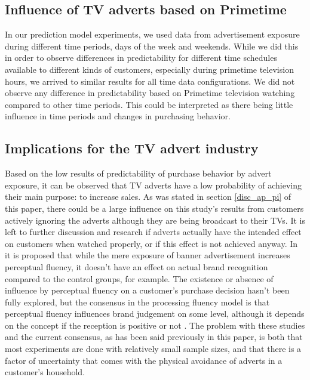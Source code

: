 \documentclass[review]{elsarticle}
\begin{document}
\subsection{Influence of TV adverts based on Primetime}
\label{disc_prime}

In our prediction model experiments, we used data from advertisement exposure during different time periods, days of the week and weekends. While we did this in order to observe differences in predictability for different time schedules available to different kinds of customers, especially during primetime television hours, we arrived to similar results for all time data configurations. We did not observe any difference in predictability based on Primetime television watching compared to other time periods. This could be interpreted as there being little influence in time periods and changes in purchasing behavior. 

\subsection{Implications for the TV advert industry}
\label{disc_advert}

Based on the low results of predictability of purchase behavior by advert exposure, it can be observed that TV adverts have a low probability of achieving their main purpose: to increase sales. As was stated in section \ref{disc_ap_pi} of this paper, there could be a large influence on this study's results from customers actively ignoring the adverts although they are being broadcast to their TVs. It is left to further discussion and research if adverts actually have the intended effect on customers when watched properly, or if this effect is not achieved anyway. In \cite{fang} it is proposed that while the mere exposure of banner advertisement increases perceptual fluency, it doesn't have an effect on actual brand recognition compared to the control groups, for example. The existence or absence of influence by perceptual fluency on a customer's purchase decision hasn't been fully explored, but the consensus in the processing fluency model is that perceptual fluency influences brand judgement on some level, although it depends on the concept if the reception is positive or not \cite{lee-a}. The problem with these studies and the current consensus, as has been said previously in this paper, is both that most experiments are done with relatively small sample sizes, and that there is a factor of uncertainty that comes with the physical avoidance of adverts in a customer's household.
\end{document}
